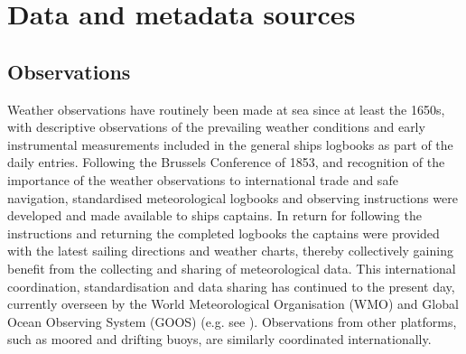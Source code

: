 \section{Data and metadata sources}\label{data_sources}
\subsection{Observations}
Weather observations have routinely been made at sea since at least the 1650s, with descriptive observations of the prevailing weather conditions and early instrumental measurements included in the general ships logbooks as part of the daily entries. 
Following the Brussels Conference of 1853, and recognition of the importance of the weather observations to international trade and safe navigation, standardised meteorological logbooks and observing instructions were developed and made available to ships captains.
In return for following the instructions and returning the completed logbooks the captains were provided with the latest sailing directions and weather charts, thereby collectively gaining benefit from the collecting and sharing of meteorological data.
This international coordination, standardisation and data sharing has continued to the present day, currently overseen by the World Meteorological Organisation (WMO) and Global Ocean Observing System (GOOS) (e.g. see \cite{Smith2019}). Observations from other platforms, such as moored and drifting buoys, are similarly coordinated internationally.

